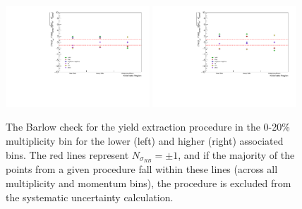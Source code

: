 \clearpage

\begin{figure}[ht]
    \centering
    \includegraphics[width=0.48\textwidth]{figures/analysis/h_lambda_yield_barlow_0_20_lowpt.pdf}
    \includegraphics[width=0.48\textwidth]{figures/analysis/h_lambda_yield_barlow_0_20_highpt.pdf}
    \caption{The Barlow check for the yield extraction procedure in the 0-20\% multiplicity bin for the lower (left) and higher (right) associated \pt bins. The red lines represent $N_{\sigma_{RB}} = \pm 1$, and if the majority of the points from a given procedure fall within these lines (across all multiplicity and momentum bins), the procedure is excluded from the systematic uncertainty calculation.}
    \label{fig:barlow_check_yield_0_20}
\end{figure}


